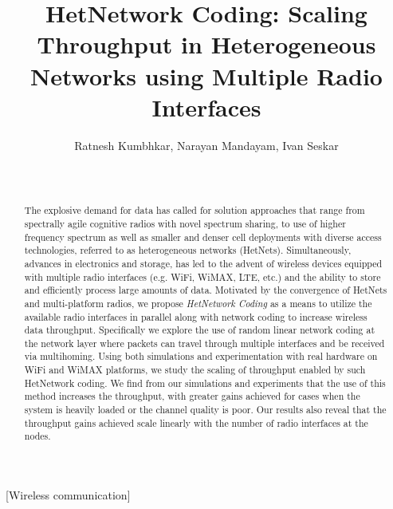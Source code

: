 \documentclass{sig-alternate-10pt}
\begin{document}
\title{HetNetwork Coding: Scaling Throughput in Heterogeneous Networks using  Multiple Radio Interfaces}

\author{
\alignauthor
Ratnesh Kumbhkar, Narayan Mandayam, Ivan Seskar\\ 
       \\
       \\
       }
       


\maketitle

\begin{abstract}
 The explosive demand for data has called for solution approaches that range from spectrally agile cognitive radios with novel spectrum sharing, to use of higher frequency spectrum as well as smaller and denser cell deployments with diverse access technologies, referred to as heterogeneous networks (HetNets). Simultaneously, advances in electronics and storage, has led to the advent of wireless devices equipped with multiple radio interfaces (e.g. WiFi, WiMAX, LTE, etc.) and the ability to store and efficiently process large amounts of data. Motivated by the convergence of HetNets and  multi-platform radios, we propose {\em HetNetwork Coding} as a means to utilize the available radio interfaces in parallel along with network coding to increase wireless data throughput. Specifically we explore the use of random linear network coding at the network layer where packets can travel through multiple interfaces and be received via multihoming. Using both simulations and experimentation with real hardware on WiFi and WiMAX platforms, we study the scaling of throughput enabled by such HetNetwork coding. We find from our simulations and experiments that the use of this method increases the throughput, with greater gains achieved for cases when the system is heavily loaded or the channel quality is poor. Our results also reveal that the throughput gains achieved scale linearly with the number of radio interfaces at the nodes.
\end{abstract}

[Wireless communication]
\end{document}
